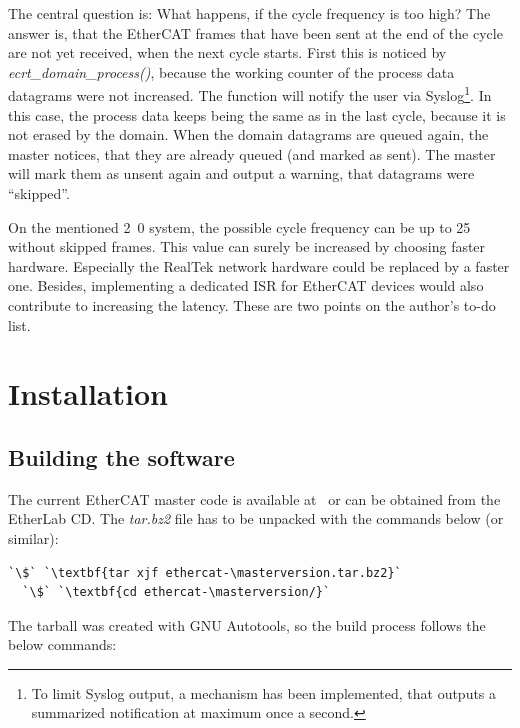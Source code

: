\documentclass[a4paper,12pt,BCOR6mm,bibtotoc,idxtotoc]{scrbook}
\newcommand{\masterversion}{1.4.0}
\begin{document}
The central question is: What happens, if the cycle frequency is too high? The
answer is, that the EtherCAT frames that have been sent at the end of the cycle
are not yet received, when the next cycle starts.  First this is noticed by
\textit{ecrt\_domain\_process()}, because the working counter of the process
data datagrams were not increased. The function will notify the user via
Syslog\footnote{To limit Syslog output, a mechanism has been implemented, that
outputs a summarized notification at maximum once a second.}. In this case, the
process data keeps being the same as in the last cycle, because it is not
erased by the domain. When the domain datagrams are queued again, the master
notices, that they are already queued (and marked as sent). The master will
mark them as unsent again and output a warning, that datagrams were
``skipped''.

On the mentioned \unit{2.0}{\giga\hertz} system, the possible cycle frequency
can be up to \unit{25}{\kilo\hertz} without skipped frames. This value can
surely be increased by choosing faster hardware. Especially the RealTek network
hardware could be replaced by a faster one. Besides, implementing a dedicated
ISR for EtherCAT devices would also contribute to increasing the latency. These
are two points on the author's to-do list.


\chapter{Installation}
\label{sec:installation}

\section{Building the software}

The current EtherCAT master code is available at~\cite{etherlab} or can be
obtained from the EtherLab CD. The \textit{tar.bz2} file has to be unpacked
with the commands below (or similar):

\begin{lstlisting}[gobble=2]
  `\$` `\textbf{tar xjf ethercat-\masterversion.tar.bz2}`
  `\$` `\textbf{cd ethercat-\masterversion/}`
\end{lstlisting}

The tarball was created with GNU Autotools, so the build process
follows the below commands:
\end{document}
